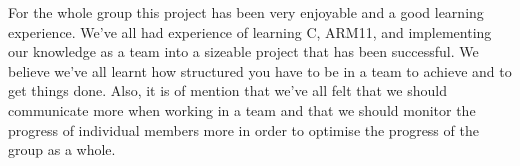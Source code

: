 For the whole group this project has been very enjoyable and a good learning experience. We've all had experience of learning C, ARM11, and implementing our knowledge as a team into a sizeable project that has been successful. 
We believe we've all learnt how structured you have to be in a team to achieve and to get things done. Also, it is of mention that we've all felt that we should communicate more when working in a team and that we should monitor the progress of individual members more in order to optimise the progress of the group as a whole.
